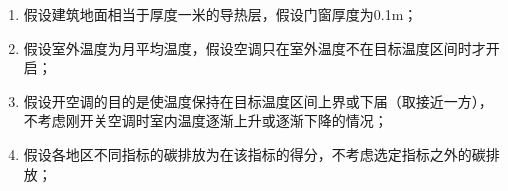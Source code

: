 \documentclass[a4paper, 12pt]{article}
\numberwithin{equation}{section}
\begin{document}
    {}
        \begin{enumerate}[(1)]
            \item 假设建筑地面相当于厚度一米的导热层，假设门窗厚度为0.1m；
            \item 假设室外温度为月平均温度，假设空调只在室外温度不在目标温度区间时才开启；
            \item 假设开空调的目的是使温度保持在目标温度区间上界或下届（取接近一方），不考虑刚开关空调时室内温度逐渐上升或逐渐下降的情况；
            \item 假设各地区不同指标的碳排放为在该指标的得分，不考虑选定指标之外的碳排放；
        \end{enumerate}


    \newpage
\end{document}
